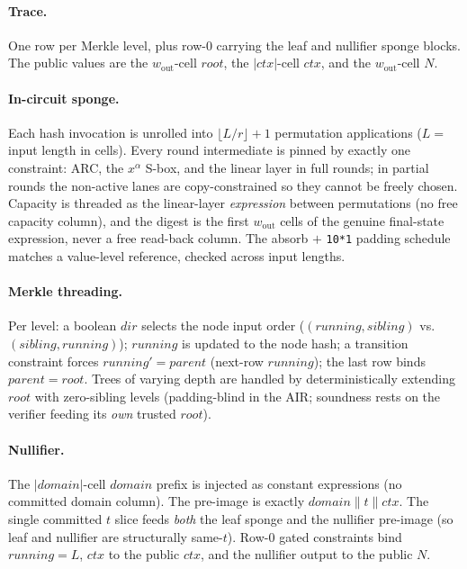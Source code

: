 \documentclass[11pt]{article}
\newcommand{\cat}{\mathbin{\|}}          %
\newcommand{\wout}{w_{\mathrm{out}}}
\theoremstyle{plain}
\theoremstyle{definition}
\begin{document}
\paragraph{Trace.} One row per Merkle level, plus row-0 carrying the leaf and nullifier sponge blocks.
The public values are the $\wout$-cell $\mathit{root}$, the $|\mathit{ctx}|$-cell $\mathit{ctx}$, and
the $\wout$-cell $N$.

\paragraph{In-circuit sponge.} Each hash invocation is unrolled into $\lfloor L/r \rfloor + 1$
permutation applications ($L = $ input length in cells). Every round intermediate is pinned by
exactly one constraint: ARC, the $x^\alpha$ S-box, and the linear layer in full rounds; in partial rounds
the non-active lanes are copy-constrained so they cannot be freely chosen. Capacity is threaded as
the linear-layer \emph{expression} between permutations (no free capacity column), and the digest is
the first $\wout$ cells of the genuine final-state expression, never a free read-back column. The
absorb $+$ \texttt{10*1} padding schedule matches a value-level reference, checked across input
lengths.

\paragraph{Merkle threading.} Per level: a boolean $\mathit{dir}$ selects the node input order
($(\mathit{running}, \mathit{sibling})$ vs.\ $(\mathit{sibling}, \mathit{running})$);
$\mathit{running}$ is updated to the node hash; a transition constraint forces
$\mathit{running}' = \mathit{parent}$ (next-row $\mathit{running}$); the last row binds
$\mathit{parent} = \mathit{root}$. Trees of varying depth are handled by deterministically extending
$\mathit{root}$ with zero-sibling levels (padding-blind in the AIR; soundness rests on the verifier
feeding its \emph{own} trusted $\mathit{root}$).

\paragraph{Nullifier.} The $|\mathit{domain}|$-cell $\mathit{domain}$ prefix is injected as constant expressions (no
committed domain column). The pre-image is exactly $\mathit{domain} \cat t \cat \mathit{ctx}$. The
single committed $t$ slice feeds \emph{both} the leaf sponge and the nullifier pre-image (so leaf and
nullifier are structurally same-$t$). Row-0 gated constraints bind $\mathit{running} = L$,
$\mathit{ctx}$ to the public $\mathit{ctx}$, and the nullifier output to the public $N$.
\end{document}
